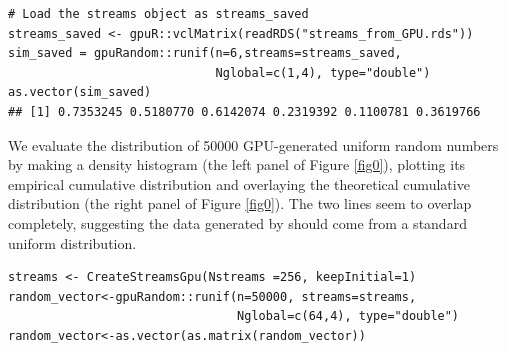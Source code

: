 \documentclass[article,nojss]{jss}\usepackage[]{graphicx}\usepackage[]{color}
\makeatletter
\newenvironment{kframe}{%
 \def\at@end@of@kframe{}%
 \ifinner\ifhmode%
  \def\at@end@of@kframe{\end{minipage}}%
  \begin{minipage}{\columnwidth}%
 \fi\fi%
 \def\FrameCommand##1{\hskip\@totalleftmargin \hskip-\fboxsep
 \colorbox{shadecolor}{##1}\hskip-\fboxsep
     \hskip-\linewidth \hskip-\@totalleftmargin \hskip\columnwidth}%
 \MakeFramed {\advance\hsize-\width
   \@totalleftmargin\z@ \linewidth\hsize
   \@setminipage}}%
 {\par\unskip\endMakeFramed%
 \at@end@of@kframe}
\newenvironment{knitrout}{}{} %
\newcommand{\fct}[1]{\code{#1()}}
\makeatother
\begin{document}
\begin{knitrout}
\color{fgcolor}\begin{kframe}
\begin{verbatim}
# Load the streams object as streams_saved
streams_saved <- gpuR::vclMatrix(readRDS("streams_from_GPU.rds"))
sim_saved = gpuRandom::runif(n=6,streams=streams_saved, 
                             Nglobal=c(1,4), type="double")
as.vector(sim_saved)
## [1] 0.7353245 0.5180770 0.6142074 0.2319392 0.1100781 0.3619766
\end{verbatim}
\end{kframe}
\end{knitrout}
We evaluate the distribution of 50000 GPU-generated uniform random numbers by making a density histogram  (the left panel of Figure \ref{fig0}), plotting its empirical cumulative distribution and overlaying the theoretical cumulative distribution (the right panel of Figure \ref{fig0}). The two lines seem to overlap completely, suggesting the data generated by \fct{gpuRandom::runif} should come from a standard uniform distribution.
\begin{knitrout}
\color{fgcolor}\begin{kframe}
\begin{verbatim}
streams <- CreateStreamsGpu(Nstreams =256, keepInitial=1)
random_vector<-gpuRandom::runif(n=50000, streams=streams, 
                                Nglobal=c(64,4), type="double")
random_vector<-as.vector(as.matrix(random_vector))
\end{verbatim}
\end{kframe}
\end{knitrout}
\end{document}
